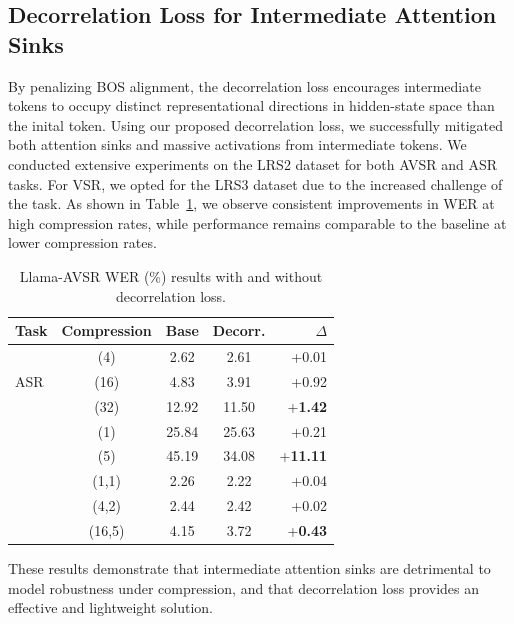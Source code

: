 \documentclass{article}
\begin{document}
\subsection{Decorrelation Loss for Intermediate Attention Sinks}
By penalizing BOS alignment, the decorrelation loss encourages intermediate tokens to occupy distinct representational directions in hidden-state space than the inital token. Using our proposed decorrelation loss, we successfully mitigated both attention sinks and massive activations from intermediate tokens. We conducted extensive experiments on the LRS2 dataset for both AVSR and ASR tasks. For VSR, we opted for the LRS3 dataset due to the increased challenge of the task. As shown in Table~\ref{tab:decor}, we observe consistent improvements in WER at high compression rates, while performance remains comparable to the baseline at lower compression rates.
\begin{table}[t]
    \centering
    \caption{Llama-AVSR WER (\%) results with and without decorrelation loss.}
    \begin{tabular}{lcccr}
        \toprule
        \textbf{Task} & \textbf{Compression} & \textbf{Base} & \textbf{Decorr.} & $\Delta$ \\
        \midrule
        \multirow{3}{*}{ASR} 
            & (4)     & 2.62 & 2.61 & +0.01 \\
            & (16)    & 4.83 & 3.91 & +0.92 \\
            & (32)    & 12.92 & 11.50 & +\textbf{1.42} \\
        \hdashline
        \multirow{2}{*}{VSR} 
            & (1)     & 25.84 & 25.63 & +0.21 \\
            & (5)     & 45.19 & 34.08 & +\textbf{11.11} \\
        \hdashline
        \multirow{4}{*}{AVSR} 
            & (1,1)   & 2.26 & 2.22 & +0.04 \\
            & (4,2)   & 2.44 & 2.42 & +0.02 \\
            & (16,5)  & 4.15 & 3.72 & +\textbf{0.43} \\
        \bottomrule
    \end{tabular}
    \label{tab:decor}
    \vspace{-0.2cm}
\end{table}
These results demonstrate that intermediate attention sinks are detrimental to model robustness under compression, and that decorrelation loss provides an effective and lightweight solution.
\end{document}
